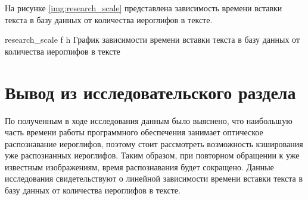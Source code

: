 \clearpage

На рисунке \ref{img:research_scale} представлена зависимость времени вставки текста в базу данных от количества иероглифов в тексте.

    {research_scale}
    {f}
    {h}
    {\linewidth}
    {График зависимости времени вставки текста в базу данных от количества иероглифов в тексте}

\section*{Вывод из исследовательского раздела}

По полученным в ходе исследования данным было выяснено, что наибольшую часть времени работы программного обеспечения занимает оптическое распознавание иероглифов, поэтому стоит рассмотреть возможность кэширования уже распознанных иероглифов. Таким образом, при повторном обращении к уже известным изображениям, время распознавания будет сокращено. Данные исследования свидетельствуют о линейной зависимости времени вставки текста в базу данных от количества иероглифов в тексте.
